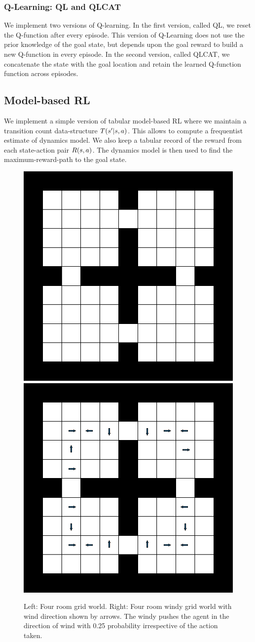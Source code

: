 \subsubsection{Q-Learning: QL and QLCAT}
We implement two versions of Q-learning. In the first version, called QL, we
reset the Q-function after every episode. This version of Q-Learning does not
use the prior knowledge of the goal state, but depends upon the goal reward to
build a new Q-function in every episode. In the second version, called QLCAT,
we concatenate the state with the goal location and retain the learned Q-function
function across episodes. 

\subsection{Model-based RL}
We implement a simple version of tabular model-based RL where we maintain a
transition count data-structure $T(s' | s, a)$.
This allows to compute a frequentist estimate of dynamics model.
We also keep a tabular record of the reward from each state-action pair
$R(s, a)$. The dynamics model is then used to find the
maximum-reward-path to the goal state.


%
\begin{figure}[h!]%
\includegraphics[width=0.48\columnwidth]{media/4-room-grid-world.pdf}
\hfill
\includegraphics[width=0.48\columnwidth]{media/4-room-windy-world.pdf}%
\caption{Left: Four room grid world. Right: Four room windy grid world with wind direction shown by arrows. The windy pushes the agent in the direction of wind with 0.25 probability irrespective of the action taken.}
\label{fig:four-room-grid-world}%
\end{figure}%
%
